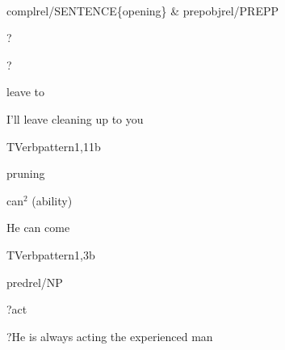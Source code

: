 \newpage
{}
\begin{vpattern}
 \norule
\csritem \mbox{}\\
     \begin{csr}
     complrel/SENTENCE\{opening\} & prepobjrel/PREPP
     \end{csr}
\remarksitem
\end{vpattern}


\begin{thetadescr}
\evitem ?
\esitem
     \begin{examples}
        \example ?
     \end{examples}
\end{thetadescr}


\begin{thetadescr}
\evitem leave to
\esitem
     \begin{examples}
        \example I'll leave cleaning up to you
     \end{examples}
\end{thetadescr}


\newpage
\verbpattern{[synOPENINFSENT]}
\begin{vpattern}
 TVerbpattern1,11b
\csritem \mbox{}\\
     \begin{csr}
      pruning 
     \end{csr}
\remarksitem
\end{vpattern}


\begin{thetadescr}
\evitem can$^{2}$ (ability)
\esitem
     \begin{examples}
        \example He can come
     \end{examples}
\end{thetadescr}


\newpage
\verbpattern{[synOPENNPPROP]}
\begin{vpattern}
 TVerbpattern1,3b  
\csritem \mbox{}\\
     \begin{csr}
     predrel/NP
     \end{csr}
\remarksitem
\end{vpattern}


\begin{thetadescr}
\evitem ?act
\esitem
     \begin{examples}
        \example ?He is always acting the experienced man
     \end{examples}
\end{thetadescr}


